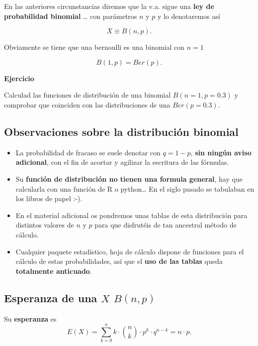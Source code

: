 \documentclass[]{book}
\providecommand{\tightlist}{%
  \setlength{\itemsep}{0pt}\setlength{\parskip}{0pt}}
\begin{document}
En las anteriores circunstancias diremos que la v.a. sigue una \textbf{ley de probabilidad binomial} \ldots{} con parámetros \(n\) y \(p\) y lo denotaremos así

\[X\equiv B(n,p).\]

Obviamente se tiene que una bernoulli es una binomial con \(n=1\)

\[B(1,p)=Ber(p).\]

\textbf{Ejercicio}

Calculad las funciones de distribución de una binomial \(B(n=1,p=0.3)\) y comprobar que coinciden con las distribuciones de una \(Ber(p=0.3)\).

\hypertarget{observaciones-sobre-la-distribuciuxf3n-binomial}{%
\subsection{Observaciones sobre la distribución binomial}\label{observaciones-sobre-la-distribuciuxf3n-binomial}}

\begin{itemize}
\tightlist
\item
  La probabilidad de fracaso se suele denotar con \(q=1-p\), \textbf{sin ningún aviso adicional}, con el fin de acortar y agilizar la escritura de las fórmulas.
\item
  Su \textbf{función de distribución no tienen una formula general}, hay que calcularla con una función de R o python\ldots{} En el siglo pasado se tabulaban en los libros de papel :-).
\item
  En el material adicional os pondremos unas tablas de esta distribución
  para distintos valores de \(n\) y \(p\) para que disfrutéis de tan ancestral método de cálculo.
\item
  Cualquier paquete estadístico, hoja de cálculo dispone de
  funciones para el cálculo de estas probabilidades, así que el \textbf{uso de las tablas} queda \textbf{totalmente anticuado}.
\end{itemize}

\hypertarget{esperanza-de-una-x-bnp}{%
\subsection{\texorpdfstring{Esperanza de una \(X\) \(B(n,p)\)}{Esperanza de una X B(n,p)}}\label{esperanza-de-una-x-bnp}}

Su \textbf{esperanza} es
\[E(X)=\displaystyle\sum_{k=0}^n k \cdot  {n \choose k }\cdot p^k\cdot q^{n-k} = n\cdot p.\]
\end{document}
